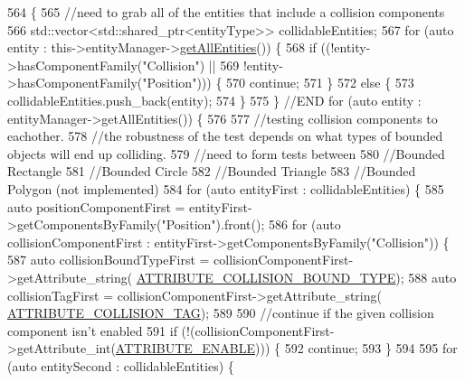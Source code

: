 \begin{DoxyCode}
564                              \{
565     \textcolor{comment}{//need to grab all of the entities that include a collision components}
566     std::vector<std::shared\_ptr<entityType>> collidableEntities;
567     \textcolor{keywordflow}{for} (\textcolor{keyword}{auto} entity : this->entityManager->\hyperlink{class_entity_manager_a452113e422a9c501bb008761f7609e33}{getAllEntities}()) \{
568         \textcolor{keywordflow}{if} ((!entity->hasComponentFamily(\textcolor{stringliteral}{"Collision"}) ||
569             !entity->hasComponentFamily(\textcolor{stringliteral}{"Position"}))) \{
570             \textcolor{keywordflow}{continue};
571         \}
572         \textcolor{keywordflow}{else} \{
573             collidableEntities.push\_back(entity);
574         \}
575     \} \textcolor{comment}{//END for (auto entity : entityManager->getAllEntities()) \{}
576 
577     \textcolor{comment}{//testing collision components to eachother.}
578     \textcolor{comment}{//the robustness of the test depends on what types of bounded objects will end up colliding.}
579     \textcolor{comment}{//need to form tests between}
580       \textcolor{comment}{//Bounded Rectangle}
581       \textcolor{comment}{//Bounded Circle}
582       \textcolor{comment}{//Bounded Triangle}
583       \textcolor{comment}{//Bounded Polygon (not implemented)}
584     \textcolor{keywordflow}{for} (\textcolor{keyword}{auto} entityFirst : collidableEntities) \{
585         \textcolor{keyword}{auto} positionComponentFirst = entityFirst->getComponentsByFamily(\textcolor{stringliteral}{"Position"}).front();
586         \textcolor{keywordflow}{for} (\textcolor{keyword}{auto} collisionComponentFirst : entityFirst->getComponentsByFamily(\textcolor{stringliteral}{"Collision"})) \{
587         \textcolor{keyword}{auto} collisionBoundTypeFirst = collisionComponentFirst->getAttribute\_string(
      \hyperlink{_a_e___attributes_8h_a22ab960bb5b8b4b1350c7a25cadc49a5}{ATTRIBUTE\_COLLISION\_BOUND\_TYPE});
588         \textcolor{keyword}{auto} collisionTagFirst = collisionComponentFirst->getAttribute\_string(
      \hyperlink{_a_e___attributes_8h_a26b14cbbf2e63e42061d132e25412f59}{ATTRIBUTE\_COLLISION\_TAG});
589 
590         \textcolor{comment}{//continue if the given collision component isn't enabled}
591         \textcolor{keywordflow}{if} (!(collisionComponentFirst->getAttribute\_int(\hyperlink{_a_e___attributes_8h_a4c775095baf8a9c99621ad9ad3b622db}{ATTRIBUTE\_ENABLE}))) \{
592             \textcolor{keywordflow}{continue};
593         \}
594 
595         \textcolor{keywordflow}{for} (\textcolor{keyword}{auto} entitySecond : collidableEntities) \{

\end{DoxyCode}

